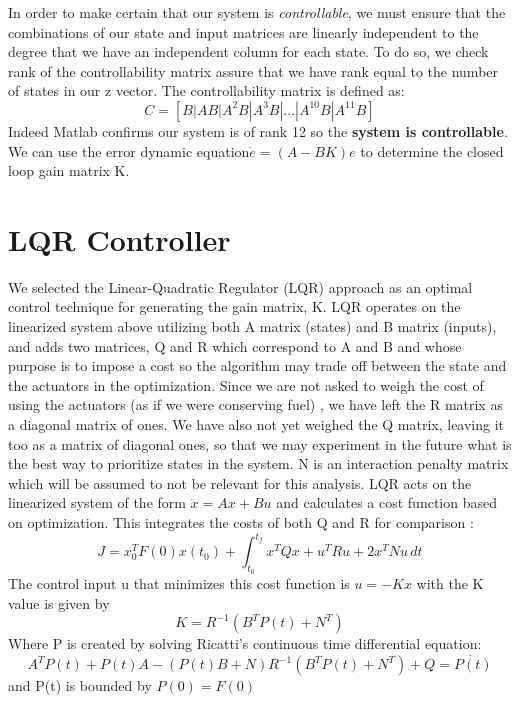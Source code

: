 \documentclass{article}
\begin{document}
In order to make certain that our system is \emph{controllable}, we must ensure that the combinations of our state and input matrices are linearly independent to the degree that we have an independent column for each state.  To do so, we check rank of the controllability matrix assure that we have rank equal to the number of states in our z vector.  The controllability matrix is defined as:
\begin{equation}
C = [B | AB | A^2B | A^3B | ... | A^{10}B | A^{11}B]
\end{equation}
\noindent Indeed Matlab confirms our system is of rank 12  so the \textbf{system is controllable}. We can use the error dynamic equation$\dot{e} = (A - BK)e$  to determine the closed loop gain matrix K.
\section*{LQR Controller}
We selected the Linear-Quadratic Regulator (LQR) approach as an optimal control technique for generating the gain matrix, K.  LQR operates on the linearized system above utilizing both A matrix (states) and B matrix (inputs), and adds two matrices, Q and R which correspond to A and B and whose purpose is to impose a cost so the algorithm may trade off between the state and the actuators in the optimization.  Since we are not asked to weigh the cost of using the actuators (as if we were conserving fuel) , we have left the R matrix as a diagonal matrix of ones.  We have also not yet weighed the Q matrix, leaving it too as a matrix of diagonal ones, so that we may experiment in the future what is the best way to prioritize states in the system.  N is an interaction penalty matrix which will be assumed to not be relevant for this analysis.
\noindent
LQR acts on the linearized system of the form $\dot{x} = Ax + Bu$ and calculates a cost function based on optimization.  This integrates the costs of both Q and R for comparison :
\begin{equation}
J =x_0^TF(0)x(t_0) +  \int_{t_0}^{t_f} x^TQx+u^TRu +2x^TNu\,dt 
\end{equation}
\noindent
The control input u that minimizes this cost function is $u= -Kx$ with the K value is given by
\begin{equation}
K = R^{-1}(B^TP(t) + N^T)
\end{equation}
\noindent
Where P is created by solving Ricatti's continuous time differential equation:
\begin{equation}
A^TP(t) + P(t)A - (P(t)B + N)R^{-1}(B^TP(t) + N^T) + Q = \dot{P(t)}
\end{equation}
\noindent
and P(t) is bounded by $P(0) = F(0)$\\
\end{document}
